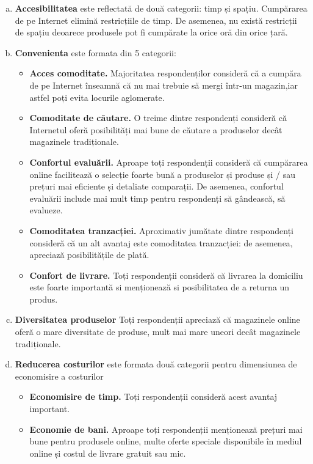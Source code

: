 \documentclass[a4paper, 12pt]{article}
\begin{document}
	\begin{enumerate}[a.]
		
\newpage		
	\item\textbf {Accesibilitatea} este reflectată de două categorii: timp și spațiu. Cumpărarea de pe Internet elimină restricțiile de timp. De asemenea, nu există restricții de spațiu deoarece produsele pot fi cumpărate la orice oră din orice țară.
	\item\textbf{Convenienta} este formata din 5 categorii: 

	\begin{itemize}
		\item\textbf{ Acces comoditate.} Majoritatea respondenților consideră că a cumpăra de pe Internet înseamnă că nu mai trebuie să mergi într-un magazin,iar astfel poți evita locurile aglomerate.
		\item\textbf{Comoditate de căutare.} O treime dintre respondenți consideră că Internetul oferă posibilități mai bune de căutare a produselor decât magazinele tradiționale.
		\item\textbf{Confortul evaluării.} Aproape toți respondenții consideră că cumpărarea online facilitează o selecție foarte bună a produselor și produse și / sau prețuri mai eficiente și detaliate comparații. De asemenea, confortul evaluării include mai mult timp pentru respondenți să gândească, să evalueze.
		\item\textbf{Comoditatea tranzacției.} Aproximativ jumătate dintre respondenți consideră că un alt avantaj este comoditatea tranzacției: de asemenea, apreciază posibilitățile de plată.	
		\item\textbf{Confort de livrare.} Toți respondenții consideră că livrarea la domiciliu este foarte importantă si menționează si posibilitatea de a returna un produs.
	\end{itemize}
		\item\textbf{Diversitatea produselor} Toți respondenții apreciază că magazinele online oferă o mare diversitate de produse, mult mai mare uneori decât magazinele tradiționale.
		\item\textbf{Reducerea costurilor} este formata două categorii pentru dimensiunea de economisire a costurilor
	\begin{itemize}
		\item\textbf{Economisire de timp.} Toți respondenții consideră acest avantaj important.
		\item\textbf{Economie de bani.} Aproape toți respondenții menționează prețuri mai bune pentru produsele online, multe oferte speciale disponibile în mediul online și costul de livrare gratuit sau mic.

\end{itemize}
\end{enumerate}
\end{document}
